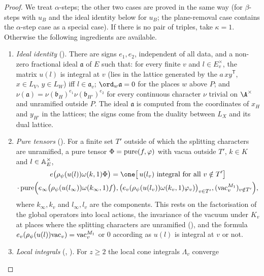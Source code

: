 \begin{proof}
We treat $\alpha$-steps; the other two cases are proved in the same way (for $\beta$-steps with $u_B$ and the ideal
identity below for $u_B$; the plane-removal case contains the $\alpha$-step case as a special case). If there is no pair of
triples, take $\kappa=1$. Otherwise the following ingredients are available.
\begin{enumerate}[label=(\roman*)]
\item\emph{Ideal identity} (). There are signs $e_1,e_2$, independent
of all data, and a non-zero fractional ideal $\mathfrak a$ of $E$ such that: for every finite $v$ and $l\in E_v^\times$,
the matrix $u(l)$ is integral at $v$ (lies in the lattice generated by the $a\,xy^{\mathsf T}$, $x\in L_V$, $y\in L_W$) iff
$l\in\mathfrak a_v$; $\ord_w\mathfrak a=0$ for the places $w$ above $P$; and $\nu(\mathfrak a)=\nu(\mathfrak b_H)^{e_1}
\nu(\mathfrak b_{H'})^{e_2}$ for every continuous character $\nu$ trivial on $\A^\times$ and unramified outside $P$. The
ideal $\mathfrak a$ is computed from the coordinates of $x_H$ and $y_{H'}$ in the lattices; the signs come from the
duality between $L_X$ and its dual lattice.
\item\emph{Pure tensors} (). For a finite set $T'$ outside of which
the splitting characters are unramified, a pure tensor $\Phi=\operatorname{pure}(f,\varphi)$ with vacua outside $T'$, $k\in K$ and
$l\in\mathbb{A}_E^\times$,
\begin{multline*}
e\bigl(\rho_\psi(u(l))\omega(k,1)\Phi\bigr)=\one\bigl[\,u(l_v)\text{ integral for all }v\notin T'\bigr]\\
\cdot\thmKpure\Bigl(e_\infty\bigl(\rho_\psi(u(l_\infty))\omega(k_\infty,1)f\bigr),\bigl(e_v(\rho_\psi(u(l_v))\omega(k_v,1)
\varphi_v)\bigr)_{v\in T'},(\thmKvac^{M_1}_v)_{v\notin T'}\Bigr),
\end{multline*}
where $k_\infty,k_v$ and $l_\infty,l_v$ are the components. This rests on the factorisation of the global operators into
local actions, the invariance of the vacuum under $K_v$ at places where the splitting characters are unramified
(), and the formula $e_v(\rho_\psi(u(l))\mathrm{vac}_v)=\mathrm{vac}^{M_1}_v$
or $0$ according as $u(l)$ is integral at $v$ or not.
\item\emph{Local integrals} (,
). For $z\ge2$ the local cone integrals $\Lambda_v$ converge

\end{enumerate}
\end{proof}
